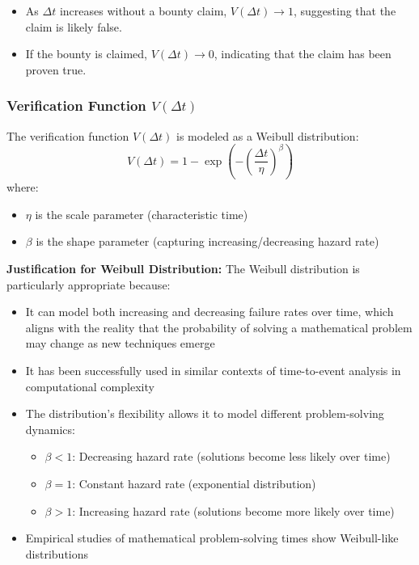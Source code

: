\documentclass[12pt]{report}
\begin{document}
\begin{itemize}
    \item As \( \Delta t \) increases without a bounty claim, \( V(\Delta t) \rightarrow 1 \), suggesting that the claim is likely false.
    \item If the bounty is claimed, \( V(\Delta t) \rightarrow 0 \), indicating that the claim has been proven true.
\end{itemize}

\subsubsection{Verification Function \( V(\Delta t) \)}
The verification function \( V(\Delta t) \) is modeled as a Weibull distribution:
\begin{equation}
    V(\Delta t) = 1 - \exp\left(-\left(\frac{\Delta t}{\eta}\right)^\beta\right)
\end{equation}
where:
\begin{itemize}
    \item \(\eta\) is the scale parameter (characteristic time)
    \item \(\beta\) is the shape parameter (capturing increasing/decreasing hazard rate)
\end{itemize}

\textbf{Justification for Weibull Distribution:}
The Weibull distribution is particularly appropriate because:
\begin{itemize}
    \item It can model both increasing and decreasing failure rates over time, which aligns with the reality that the probability of solving a mathematical problem may change as new techniques emerge
    \item It has been successfully used in similar contexts of time-to-event analysis in computational complexity \cite{HisanoSornette2012}
    \item The distribution's flexibility allows it to model different problem-solving dynamics:
    \begin{itemize}
        \item \(\beta < 1\): Decreasing hazard rate (solutions become less likely over time)
        \item \(\beta = 1\): Constant hazard rate (exponential distribution)
        \item \(\beta > 1\): Increasing hazard rate (solutions become more likely over time)
    \end{itemize}
    \item Empirical studies of mathematical problem-solving times show Weibull-like distributions \cite{GhoshAdhikaryPaul2017}
\end{itemize}
\end{document}
